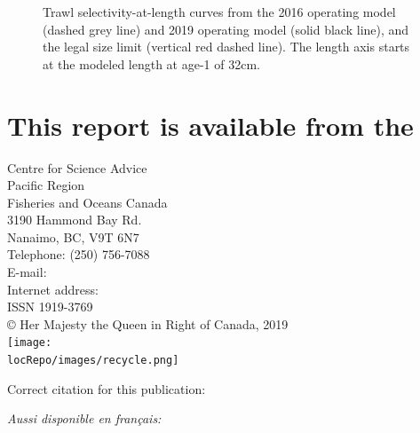 \documentclass[11pt]{book}
\newcommand{\locRepo}{csas-style}
\newcommand{\rdYear}{2019}
\newcommand{\rdNumber}{\threedigits{999}}
\newcommand{\rdRegion}{Pacific Region}
\begin{document}
\newpage
\begin{figure}[htb]

{\centering {} 

}

\caption{Trawl selectivity-at-length curves from the 2016 operating model (dashed grey line) and 2019 operating model (solid black line), and the legal size limit (vertical red dashed line). The length axis starts at the modeled length at age-1 of 32cm.}\label{fig:unnamed-chunk-34}
\end{figure}
\clearpage

\section{This report is available from the}
\begin{center}
Centre for Science Advice\\
\rdRegion{}\\
Fisheries and Oceans Canada\\
3190 Hammond Bay Rd.\\Nanaimo, BC, V9T 6N7\\
\vspace{0.1cm}
Telephone: (250) 756-7088\\
E-mail: \\
Internet address: \\
\vspace{0.1cm}
ISSN 1919-3769\\
\copyright{} Her Majesty the Queen in Right of Canada, \rdYear{}\\
\vspace{0.2cm}
\texttt{[image: \\locRepo/images/recycle.png]}
\end{center}
Correct citation for this publication:

\citeEng{\rdYear{}/\rdNumber{}}

\emph{Aussi disponible en fran\c{c}ais:}

\citeFr{\rdYear{}/\rdNumber{}}

\setlength{\parindent}{0in} \setlength{\leftskip}{0in} \setlength{\parskip}{4pt}
\hypertarget{refs}{}
\end{document}

